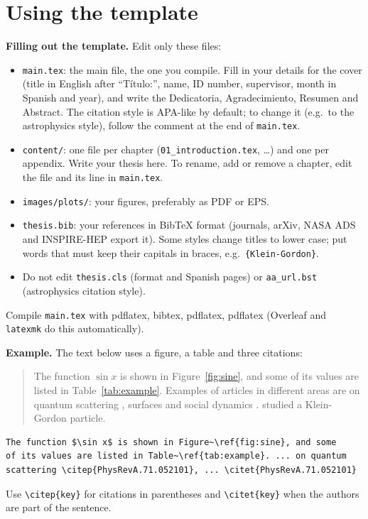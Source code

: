 \documentclass[a4paper,10pt,openany]{thesis}
\begin{document}
\section{Using the template}

\textbf{Filling out the template.} Edit only these files:
\begin{itemize}
    \item \texttt{main.tex}: the main file, the one you compile. Fill in your details for the cover (title in English after ``Título:'', name, ID number, supervisor, month in Spanish and year), and write the Dedicatoria, Agradecimiento, Resumen and Abstract. The citation style is APA-like by default; to change it (e.g.\ to the astrophysics style), follow the comment at the end of \texttt{main.tex}.
    \item \texttt{content/}: one file per chapter (\texttt{01\_introduction.tex}, \ldots) and one per appendix. Write your thesis here. To rename, add or remove a chapter, edit the file and its \verb|| line in \texttt{main.tex}.
    \item \texttt{images/plots/}: your figures, preferably as PDF or EPS.
    \item \texttt{thesis.bib}: your references in BibTeX format (journals, arXiv, NASA ADS and INSPIRE-HEP export it). Some styles change titles to lower case; put words that must keep their capitals in braces, e.g.\ \verb|{Klein-Gordon}|.
    \item Do not edit \texttt{thesis.cls} (format and Spanish pages) or \texttt{aa\_url.bst} (astrophysics citation style).
\end{itemize}
Compile \texttt{main.tex} with pdflatex, bibtex, pdflatex, pdflatex (Overleaf and \texttt{latexmk} do this automatically).

\textbf{Example.} The text below uses a figure, a table and three citations:

\begin{quote}
The function $\sin x$ is shown in Figure~\ref{fig:sine}, and some of its values are listed in Table~\ref{tab:example}. Examples of articles in different areas are on quantum scattering \citep{PhysRevA.71.052101}, surfaces \citep{PhysRevB.70.125402} and social dynamics \citep{PhysRevE.110.024311}. \citet{PhysRevA.71.052101} studied a Klein-Gordon particle.
\end{quote}
\vspace{-4pt}
\begin{verbatim}
The function $\sin x$ is shown in Figure~\ref{fig:sine}, and some
of its values are listed in Table~\ref{tab:example}. ... on quantum
scattering \citep{PhysRevA.71.052101}, ... \citet{PhysRevA.71.052101}
\end{verbatim}
Use \verb|\citep{key}| for citations in parentheses and \verb|\citet{key}| when the authors are part of the sentence.
\end{document}
